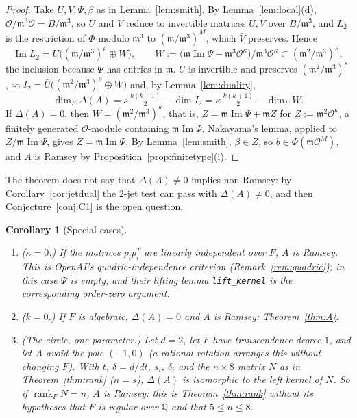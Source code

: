 \documentclass[11pt]{amsart}
\newcommand{\Q}{\mathbb{Q}}
\theoremstyle{plain}
\newtheorem{corollary}[theorem]{Corollary}
\theoremstyle{definition}
\begin{document}
\begin{proof}
Take $U,V,\Psi,\beta$ as in Lemma~\ref{lem:smith}. By Lemma~\ref{lem:local}(d), $\mathcal O/\mathfrak m^3\mathcal O=
B/\mathfrak m^3$, so $U$ and $V$ reduce to invertible matrices $\bar U,\bar V$ over $B/\mathfrak m^3$, and
$L_2$ is the restriction of $\Phi$ modulo $\mathfrak m^3$ to $(\mathfrak m/\mathfrak m^3)^M$, which $\bar V$
preserves. Hence
\[
 \operatorname{Im}L_2=\bar U\bigl((\mathfrak m/\mathfrak m^3)^\rho\oplus W\bigr),\qquad
 W:=\bigl(\mathfrak m\operatorname{Im}\Psi+\mathfrak m^3\mathcal O^\kappa\bigr)/\mathfrak m^3\mathcal O^\kappa
 \subset(\mathfrak m^2/\mathfrak m^3)^\kappa,
\]
the inclusion because $\Psi$ has entries in $\mathfrak m$. $\bar U$ is invertible and preserves
$(\mathfrak m^2/\mathfrak m^3)^s$, so
$I_2=\bar U\bigl((\mathfrak m^2/\mathfrak m^3)^\rho\oplus W\bigr)$ and, by Lemma~\ref{lem:duality},
\[
 \dim_F\Delta(A)=s\,\tfrac{k(k+1)}2-\dim I_2=\kappa\,\tfrac{k(k+1)}2-\dim_FW .
\]
If $\Delta(A)=0$, then $W=(\mathfrak m^2/\mathfrak m^3)^\kappa$, that is,
$Z=\mathfrak m\operatorname{Im}\Psi+\mathfrak mZ$ for $Z:=\mathfrak m^2\mathcal O^\kappa$, a finitely generated
$\mathcal O$-module containing $\mathfrak m\operatorname{Im}\Psi$. Nakayama's lemma, applied to
$Z/\mathfrak m\operatorname{Im}\Psi$, gives $Z=\mathfrak m\operatorname{Im}\Psi$. By Lemma~\ref{lem:smith},
$\beta\in Z$, so $b\in\Phi(\mathfrak m\mathcal O^M)$, and $A$ is Ramsey by
Proposition~\ref{prop:finitetype}(i).
\end{proof}

\noindent The theorem does not say that $\Delta(A)\ne0$ implies non-Ramsey: by
Corollary~\ref{cor:jetdual} the 2-jet test can pass with $\Delta(A)\ne0$, and then
Conjecture~\ref{conj:C1} is the open question.

\begin{corollary}[Special cases]\label{cor:rigidcases}
\begin{enumerate}
\item[(a)] ($\kappa=0$.) If the matrices $p_ip_i^T$ are linearly independent over $F$, $A$ is Ramsey. This
is OpenAI's quadric-independence criterion \cite[Prop.~7.3]{OAI172} (Remark~\ref{rem:quadric}); in this
case $\Psi$ is empty, and their lifting lemma \texttt{lift\_\allowbreak{}kernel} is the corresponding
order-zero argument.
\item[(b)] ($k=0$.) If $F$ is algebraic, $\Delta(A)=0$ and $A$ is Ramsey: Theorem~\ref{thm:A}.
\item[(c)] (The circle, one parameter.) Let $d=2$, let $F$ have transcendence degree $1$, and let $A$ avoid
the pole $(-1,0)$ (a rational rotation arranges this without changing $F$). With $t$, $\delta=d/dt$,
$s_i$, $\delta_i$ and the $n\times8$ matrix $N$ as in Theorem~\ref{thm:rank} ($n=s$), $\Delta(A)$ is
isomorphic to the left kernel of $N$. So if $\operatorname{rank}_FN=n$, $A$ is Ramsey: this is
Theorem~\ref{thm:rank} without its hypotheses that $F$ is regular over $\Q$ and that $5\le n\le8$.
\end{enumerate}
\end{corollary}
\end{document}
